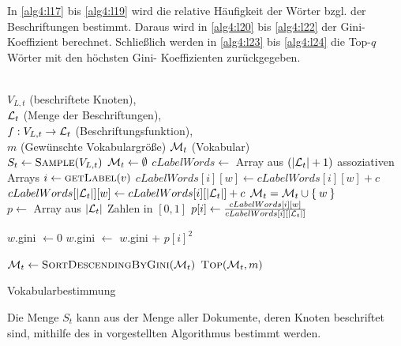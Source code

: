 In \cref{alg4:l17} bis \ref{alg4:l19} wird die relative Häufigkeit der Wörter
bzgl. der Beschriftungen bestimmt. Daraus wird in \cref{alg4:l20} bis
\ref{alg4:l22} der Gini-Koeffizient berechnet. Schließlich werden in
\cref{alg4:l23} bis \ref{alg4:l24} die Top-$q$ Wörter mit den höchsten Gini-
Koeffizienten zurückgegeben.

\begin{algorithm}[ht]
    \begin{algorithmic}[1]
        \Require \\
                 $V_{L,t}$ (beschriftete Knoten),\\
                 $\mathcal{L}_t$ (Menge der Beschriftungen),\\
                 $f:V_{L,t} \rightarrow \mathcal{L}_t$ (Beschriftungsfunktion),\\
                 $m$ (Gewünschte Vokabulargröße)
        \Ensure  $\mathcal{M}_t$ (Vokabular)\\
        \State $S_t \gets \Call{Sample}{V_{L,t}}$\label{alg4:l6} 
        \State $\mathcal{M}_t \gets \emptyset$ 
        \State $cLabelWords \gets$ Array aus $(|\mathcal{L}_t|+1)$ assoziativen Arrays\label{alg4:l8}
         \label{alg4:l10}
            \State $i \gets \Call{getLabel}{v}$
            \State {}
                \State $cLabelWords[i][w] \gets cLabelWords[i][w] + c$
                \State $cLabelWords[|\mathcal{L}_t|][w] \gets cLabelWords[i][|\mathcal{L}_t|] + c$
                \State $\mathcal{M}_t = \mathcal{M}_t \cup \Set{w}$
            \EndFor
        \EndFor\label{alg4:l12}
		\\
            \State $p \gets $ Array aus $|\mathcal{L}_t|$ Zahlen in $[0, 1]$\label{alg4:l17}
                \State $p[i] \gets \frac{cLabelWords[i][w]}{cLabelWords[i][|\mathcal{L}_t|]}$
            \EndFor\label{alg4:l19}

            \State $w$.gini $\gets 0$ \label{alg4:l20}
                \State $w$.gini $\gets$ $w$.gini + $p[i]^2$
            \EndFor\label{alg4:l22}
        \EndFor

        \State $\M_t \gets \Call{SortDescendingByGini}{\M_t}$\label{alg4:l23}
        \State \Return $\Call{Top}{\M_t, m}$\label{alg4:l24}
    \end{algorithmic}
\caption{Vokabularbestimmung}
\label{alg:vokabularbestimmung}
\end{algorithm}

Die Menge $S_t$ kann aus der Menge aller Dokumente, deren Knoten beschriftet
sind, mithilfe des in \cite{Vitter} vorgestellten Algorithmus bestimmt werden.
